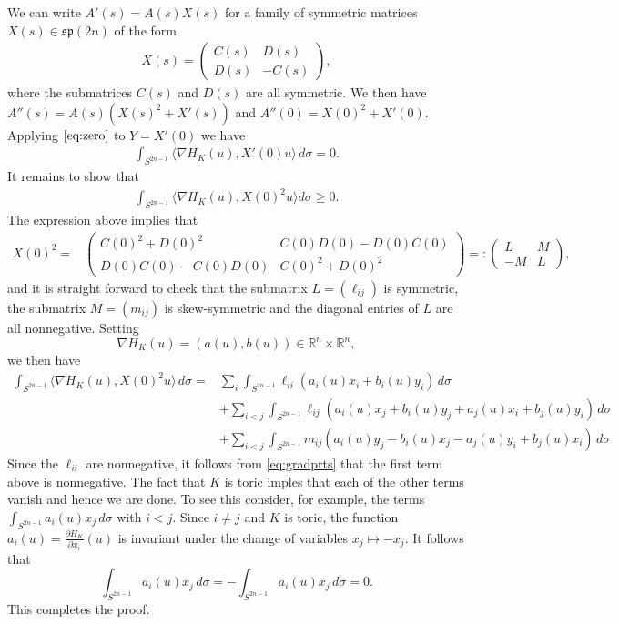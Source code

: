 \documentclass[12pt]{amsart}
\theoremstyle{definition}
\newcommand{\RR}{{\mathbb R}}
\begin{document}
We can write $A'(s) = A(s)X(s)$ for a family of symmetric matrices $X(s) \in \mathfrak{sp}(2n)$ of the form 
\begin{align*}
    X(s) = \begin{pmatrix}
    C(s) & D(s)\\
    D(s) & -C(s)
    \end{pmatrix},
\end{align*}
where the submatrices $C(s)$ and $D(s)$ are all symmetric. We then have $A''(s) = A(s) (X(s)^2 + X'(s))$ and $A''(0) = X(0)^2 + X'(0)$. Applying $\eqref{eq:zero}$ to $Y=X'(0)$ we have
\begin{align*}
    \int_{S^{2n-1}} \langle \nabla H_K(u), X'(0)u \rangle \, d\sigma = 0.
\end{align*}
It remains to show that 
\begin{align*}
    \int_{S^{2n-1}} \langle \nabla H_K(u), X(0)^2u \rangle d\sigma \geq 0.
\end{align*}
The expression above implies that 
\begin{align*}
    X(0)^2 =&\begin{pmatrix}
    C(0)^2+D(0)^2 & C(0)D(0) - D(0)C(0)\\
    D(0)C(0) - C(0)D(0) & C(0)^2 +D(0)^2
    \end{pmatrix}=:    \begin{pmatrix}
    L & M\\
    -M & L
    \end{pmatrix},
\end{align*}
and it is straight forward to check that the submatrix $L =(\ell_{ij})$ is symmetric, the submatrix $M=(m_{ij})$ is skew-symmetric and the diagonal entries of $L$ are all nonnegative. Setting $$\nabla H_K(u) = (a(u), b(u)) \in \RR^n \times \RR^n,$$ we then have
\begin{align*}
     \int_{S^{2n-1}} \langle \nabla H_K(u), X(0)^2u \rangle \, d\sigma =& \sum_i  \int_{S^{2n-1}} \ell_{ii}(a_i(u)x_i + b_i(u)y_i) \, d\sigma\\&+ \sum_{i<j}  \int_{S^{2n-1}} \ell_{ij} (a_i(u)x_j +b_i(u)y_j +a_j(u)x_i +b_j(u)y_i) \, d\sigma\\& + \sum_{i<j}  \int_{S^{2n-1}} m_{ij}(a_i(u)y_j-b_i(u)x_j - a_j(u)y_i + b_j(u)x_i) \, d\sigma
\end{align*}
Since the $\ell_{ii}$ are nonnegative, it follows from \eqref{eq:gradprts} that the first term above is nonnegative. The fact that $K$ is toric imples that each of the other terms vanish and hence we are done. To see this consider, for example, the terms $\int_{S^{2n-1}}a_i(u)x_j\, d\sigma$ with $i<j.$ Since $i \neq j$ and $K$ is toric, the function $a_i(u) = \frac{\partial H_K}{\partial x_i}(u)$ is invariant under the change of variables $x_j \mapsto -x_j$. It follows that $$\int_{S^{2n-1}}a_i(u)x_j\, d\sigma =-\int_{S^{2n-1}}a_i(u)x_j\, d\sigma =0.$$
This completes the proof.
\end{document}

